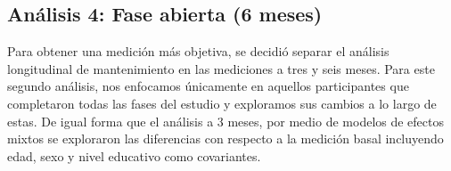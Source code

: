 \subsection{Análisis 4: Fase abierta (6 meses)}
Para obtener una medición más objetiva, se decidió separar el análisis longitudinal de mantenimiento en las mediciones a tres y seis meses. Para este segundo análisis, nos enfocamos únicamente en aquellos participantes que completaron todas las fases del estudio y exploramos sus cambios a lo largo de estas.
De igual forma que el análisis a 3 meses, por medio de modelos de efectos mixtos se exploraron las diferencias con respecto a la medición basal incluyendo edad, sexo y nivel educativo como covariantes.

